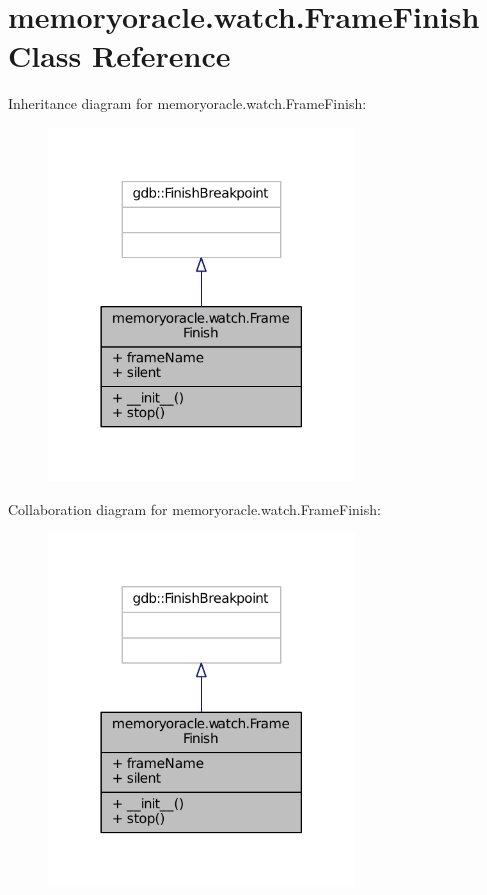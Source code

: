 \hypertarget{classmemoryoracle_1_1watch_1_1FrameFinish}{}\section{memoryoracle.\+watch.\+Frame\+Finish Class Reference}
\label{classmemoryoracle_1_1watch_1_1FrameFinish}


Inheritance diagram for memoryoracle.\+watch.\+Frame\+Finish\+:\nopagebreak
\begin{figure}[H]
\begin{center}
\leavevmode
\includegraphics[width=230pt]{classmemoryoracle_1_1watch_1_1FrameFinish__inherit__graph}
\end{center}
\end{figure}


Collaboration diagram for memoryoracle.\+watch.\+Frame\+Finish\+:\nopagebreak
\begin{figure}[H]
\begin{center}
\leavevmode
\includegraphics[width=230pt]{classmemoryoracle_1_1watch_1_1FrameFinish__coll__graph}
\end{center}
\end{figure}
